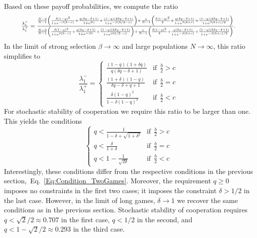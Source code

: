 \documentclass[11pt]{article}
\theoremstyle{plainCl1}
\theoremstyle{plainCl2}
\begin{document}
Based on these payoff probabilities, we compute the ratio
\begin{equation}
  \resizebox{.9\textwidth}{!}
  {%
  $\frac{\lambda^{-}_1}{\lambda^{+}_1} =
  \frac{\frac{N - 2}{N-1} \left(\frac{\delta \left(1 - q\right)^{2}}{1 + e^{- \beta \left(b - c\right)}} + \frac{q \left(\delta q - \delta + 1\right)}{1+e^{\beta c} } + \frac{\left(1 - q\right) \left(2 \delta q - \delta + 1\right)}{1 + e^{- \beta \left(b/2- c\right)}}\right) + \frac{1}{N-1} \left(\frac{\delta \left(1 - q\right)^{2}}{2} + \frac{q \left(\delta q - \delta + 1\right)}{1 + e^{ \beta \left( b + c\right)}} + \frac{\left(1 - q\right) \left(2 \delta q - \delta + 1\right)}{1 + e^{\beta (b+c)/2}}\right)}
  {\frac{N - 2}{N-1} \left(\frac{\delta \left(1 - q\right)^{2}}{1 + e^{ \beta \left(b - c\right)}} + \frac{q \left(\delta q - \delta + 1\right)}{1 + e^{- \beta c}} + \frac{\left(1 - q\right) \left(2 \delta q - \delta + 1\right)}{1 + e^{ \beta \left(b/2-c\right)}}\right) + \frac{1}{N-1}\left(\frac{\delta \left(1 - q\right)^{2}}{2} + \frac{q \left(\delta q - \delta + 1\right)}{1 + e^{- \beta \left(b + c\right)}} + \frac{\left(1 - q\right) \left(2 \delta q - \delta + 1\right)}{1 + e^{- \beta (b+c)/2}}\right)}.
  $}
\end{equation}
In the limit of strong selection \(\beta \rightarrow \infty\) and large
populations \(N \rightarrow \infty \), this ratio simplifies to
\begin{equation}
\frac{\lambda^{-}_1}{\lambda^{+}_1} = 
\begin{cases}
  \frac{(1-q) (1+\delta q)}{q \left(\delta q - \delta + 1\right)}  &\text{if}~~\frac{b}{2} > c \\[0.2cm]
  \frac{\left(1+\delta \right) \left(1-q\right)} {\delta q - \delta + q + 1} &\text{if}~~ \frac{b}{2} = c \\[0.2cm]
  \frac{\delta (1-q)^{2}}{1-\delta(1-q)^2 } &\text{if}~~ \frac{b}{2} < c
\end{cases}
\end{equation}
For stochastic stability of cooperation we require this ratio to be larger than one. This yields the conditions
\begin{equation} \label{Eq:Condition_TwoRounds}
\begin{cases}
  q<\frac{1}{1-\delta+\sqrt{1+\delta^2}}  &\text{if}~~\frac{b}{2} > c \\[0.1cm]
  q<\frac{\delta} {1+\delta} &\text{if}~~ \frac{b}{2} = c \\[0.1cm]
  q<1-\frac{1}{\sqrt{2\delta}} &\text{if}~~ \frac{b}{2} < c
\end{cases}
\end{equation}
Interestingly, these conditions differ from the respective conditions in the previous section,~Eq.~\eqref{Eq:Condition_TwoGames}.
Moreover, the requirement $q\ge 0$ imposes no constraints in the first two cases; it imposes the constraint $\delta\!>\!1/2$ in the last case. 
However, in the limit of long games, $\delta\!\rightarrow \!1$ we recover the same conditions as in the previous section. Stochastic stability of cooperation requires $q\!<\!\sqrt{2}/2\!\approx\! 0.707$ in the first case, $q\!<\!1/2$ in the second, and $q<1\!-\!\sqrt{2}/2\approx 0.293$ in the third case. 
\end{document}
